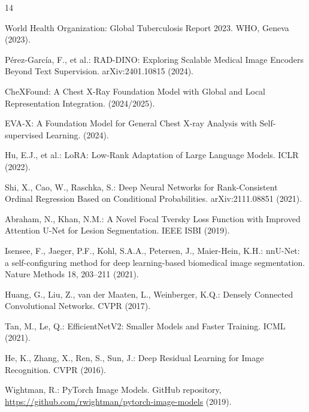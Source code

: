 \documentclass[runningheads]{llncs}
\begin{document}
\begin{thebibliography}{14}

World Health Organization: Global Tuberculosis Report 2023. WHO, Geneva
(2023).

P\'erez-Garc\'ia, F., et al.: RAD-DINO: Exploring Scalable Medical Image
Encoders Beyond Text Supervision. arXiv:2401.10815 (2024).

CheXFound: A Chest X-Ray Foundation Model with Global and Local
Representation Integration. (2024/2025).

EVA-X: A Foundation Model for General Chest X-ray Analysis with
Self-supervised Learning. (2024).

Hu, E.J., et al.: LoRA: Low-Rank Adaptation of Large Language Models. ICLR
(2022).

Shi, X., Cao, W., Raschka, S.: Deep Neural Networks for Rank-Consistent
Ordinal Regression Based on Conditional Probabilities. arXiv:2111.08851
(2021).

Abraham, N., Khan, N.M.: A Novel Focal Tversky Loss Function with Improved
Attention U-Net for Lesion Segmentation. IEEE ISBI (2019).

Isensee, F., Jaeger, P.F., Kohl, S.A.A., Petersen, J., Maier-Hein, K.H.:
nnU-Net: a self-configuring method for deep learning-based biomedical image
segmentation. Nature Methods 18, 203--211 (2021).

Huang, G., Liu, Z., van der Maaten, L., Weinberger, K.Q.: Densely Connected
Convolutional Networks. CVPR (2017).

Tan, M., Le, Q.: EfficientNetV2: Smaller Models and Faster Training. ICML
(2021).

He, K., Zhang, X., Ren, S., Sun, J.: Deep Residual Learning for Image
Recognition. CVPR (2016).

Wightman, R.: PyTorch Image Models. GitHub repository,
\url{https://github.com/rwightman/pytorch-image-models} (2019).

\end{thebibliography}
\end{document}
